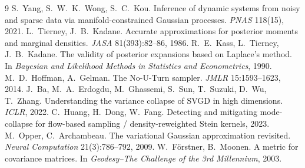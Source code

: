 \documentclass[11pt]{article}
\theoremstyle{plain}
\theoremstyle{definition}
\theoremstyle{remark}
\begin{document}
\begin{thebibliography}{9}
\small
{} S.~Yang, S.~W.~K.~Wong, S.~C.~Kou.
  Inference of dynamic systems from noisy and sparse data via manifold-constrained Gaussian processes.
  \emph{PNAS} 118(15), 2021.
 L.~Tierney, J.~B.~Kadane.
  Accurate approximations for posterior moments and marginal densities.
  \emph{JASA} 81(393):82--86, 1986.
 R.~E.~Kass, L.~Tierney, J.~B.~Kadane.
  The validity of posterior expansions based on Laplace's method. In
  \emph{Bayesian and Likelihood Methods in Statistics and Econometrics}, 1990.
 M.~D.~Hoffman, A.~Gelman.
  The No-U-Turn sampler. \emph{JMLR} 15:1593--1623, 2014.
 J.~Ba, M.~A.~Erdogdu, M.~Ghassemi, S.~Sun, T.~Suzuki, D.~Wu, T.~Zhang.
  Understanding the variance collapse of SVGD in high dimensions.
  \emph{ICLR}, 2022.
 C.~Huang, H.~Dong, W.~Fang.
  Detecting and mitigating mode-collapse for flow-based sampling / density-reweighted Stein kernels, 2023.
 M.~Opper, C.~Archambeau.
  The variational Gaussian approximation revisited. \emph{Neural Computation} 21(3):786--792, 2009.
 W.~F\"orstner, B.~Moonen.
  A metric for covariance matrices. In \emph{Geodesy--The Challenge of the 3rd Millennium}, 2003.
\end{thebibliography}
\end{document}
